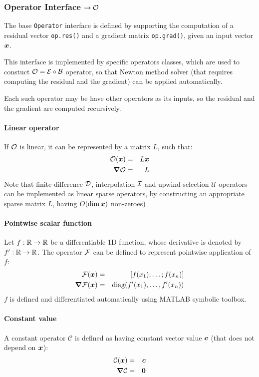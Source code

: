\subsubsection{Operator Interface $ \rightarrow \mathcal{O}$}
The base \verb|Operator| interface is defined by 
supporting the computation of a residual vector \verb|op.res()|
and a gradient matrix \verb|op.grad()|, given an input vector $\boldsymbol{x}$.

This interface is implemented by specific operators classes,
which are used to constuct $\mathcal{O} = \mathcal{E} \circ \mathcal{B}$ operator, so that 
Newton method solver (that requires computing the residual and the gradient) 
can be applied automatically.

Each such operator may be have other operators as its inputs, so the residual
and the gradient are computed recursively.

\paragraph{Linear operator}
If $\mathcal{O}$ is linear, it can be represented by a matrix $L$, such that:
\begin{eqnarray}
\mathcal{O}(\boldsymbol{x}) &=& L \boldsymbol{x} \\
\boldsymbol{\nabla}\mathcal{O} &=& L 
\end{eqnarray}
Note that finite difference $\mathcal{D}$, interpolation $\mathcal{I}$ and 
upwind selection $\mathcal{U}$ operators
can be implemented as linear sparse operators, by constructing 
an appropriate sparse matrix $L$, having $O(\dim \boldsymbol{x})$ non-zeroes) 

\paragraph{Pointwise scalar function}
Let $f: \mathbb{R} \rightarrow \mathbb{R}$ be a differentiable 1D function, whose derivative is
denoted by $f': \mathbb{R} \rightarrow \mathbb{R}$. The operator $\mathcal{F}$ can be defined to
represent pointwise application of $f$:
\begin{eqnarray}
\mathcal{F}(\boldsymbol{x}) &=& [f(x_1); \ldots; f(x_n)] \\
\boldsymbol{\nabla}\mathcal{F}(\boldsymbol{x}) &=& \mathrm{diag}(f'(x_1), \ldots, f'(x_n))
\end{eqnarray}
$f$ is defined and differentiated automatically using MATLAB symbolic toolbox.

\paragraph{Constant value}
A constant operator $\mathcal{C}$ is defined as having constant vector value $\boldsymbol{c}$ 
(that does not depend on $\boldsymbol{x}$):
\begin{eqnarray}
\mathcal{C}(\boldsymbol{x}) &=& \boldsymbol{c} \\
\boldsymbol{\nabla}\mathcal{C} &=& \boldsymbol{0}
\end{eqnarray}

